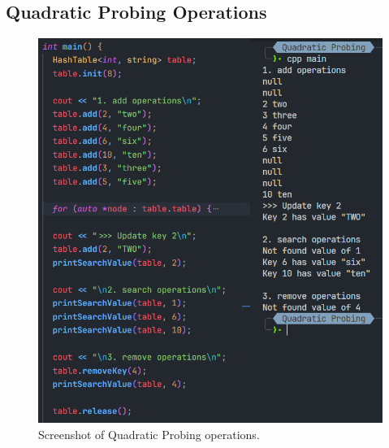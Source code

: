 \pagebreak
\subsection{Quadratic Probing Operations}
\begin{figure}[!ht]
	\centering
	\includegraphics[width=\textwidth]{imgs/Quadratic Probing/operations.png}
	\caption{Screenshot of Quadratic Probing operations.}\label{fig:quadprobing-operations}
\end{figure}